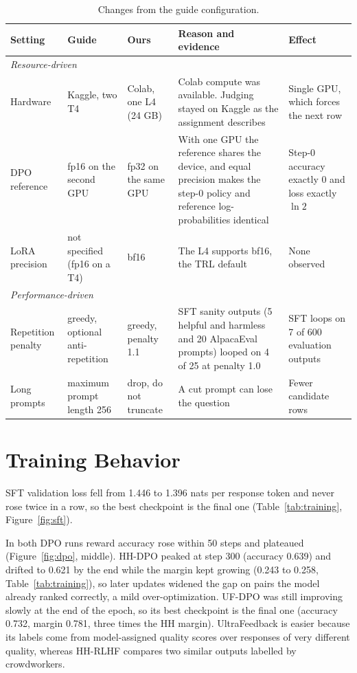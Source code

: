 \documentclass{article}
\begin{document}
\begin{table}[t]
  \centering
  \caption{Changes from the guide configuration.}
  \label{tab:deviations}
  \footnotesize
  \setlength{\tabcolsep}{3pt}
  \begin{tabular}{p{1.8cm} p{1.9cm} p{2.4cm} p{4.2cm} p{2.4cm}}
    \toprule
    Setting & Guide & Ours & Reason and evidence & Effect \\
    \midrule
    \multicolumn{5}{l}{\textit{Resource-driven}} \\
    Hardware & Kaggle, two T4 & Colab, one L4 (24 GB) & Colab compute was available. Judging stayed on Kaggle as the assignment describes & Single GPU, which forces the next row \\
    DPO reference & fp16 on the second GPU & fp32 on the same GPU & With one GPU the reference shares the device, and equal precision makes the step-0 policy and reference log-probabilities identical & Step-0 accuracy exactly 0 and loss exactly $\ln 2$ \\
    LoRA precision & not specified (fp16 on a T4) & bf16 & The L4 supports bf16, the TRL default & None observed \\
    \midrule
    \multicolumn{5}{l}{\textit{Performance-driven}} \\
    Repetition penalty & greedy, optional anti-repetition & greedy, penalty 1.1 & SFT sanity outputs (5 helpful and harmless and 20 AlpacaEval prompts) looped on 4 of 25 at penalty 1.0 & SFT loops on 7 of 600 evaluation outputs \\
    Long prompts & maximum prompt length 256 & drop, do not truncate & A cut prompt can lose the question & Fewer candidate rows \\
    \bottomrule
  \end{tabular}
\end{table}


\section{Training Behavior}
\label{sec:training}

SFT validation loss fell from 1.446 to 1.396 nats per response token and never rose twice in a row, so the best checkpoint is the final one (Table~\ref{tab:training}, Figure~\ref{fig:sft}).

In both DPO runs reward accuracy rose within 50 steps and plateaued (Figure~\ref{fig:dpo}, middle). HH-DPO peaked at step 300 (accuracy 0.639) and drifted to 0.621 by the end while the margin kept growing (0.243 to 0.258, Table~\ref{tab:training}), so later updates widened the gap on pairs the model already ranked correctly, a mild over-optimization. UF-DPO was still improving slowly at the end of the epoch, so its best checkpoint is the final one (accuracy 0.732, margin 0.781, three times the HH margin). UltraFeedback is easier because its labels come from model-assigned quality scores over responses of very different quality, whereas HH-RLHF compares two similar outputs labelled by crowdworkers.
\end{document}
